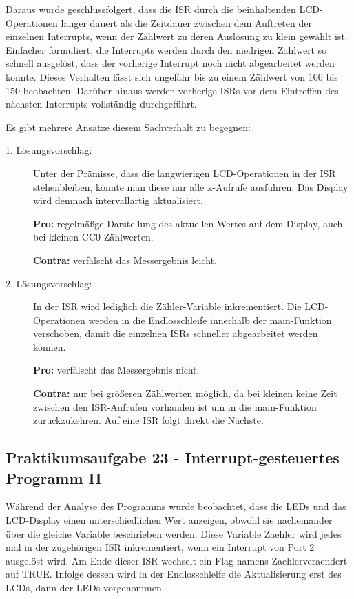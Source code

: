 \documentclass[12pt,a4paper,bibliography=totocnumbered,listof=totocnumbered]{scrartcl}
\begin{document}
Daraus wurde geschlussfolgert, dass die ISR durch die beinhaltenden LCD-Operationen länger dauert als die Zeitdauer zwischen dem Auftreten der einzelnen Interrupts, wenn der Zählwert zu deren Auslösung zu klein gewählt ist. Einfacher formuliert, die Interrupts werden durch den niedrigen Zählwert so schnell ausgelöst, dass der vorherige Interrupt noch nicht abgearbeitet werden konnte. Dieses Verhalten lässt sich ungefähr bis zu einem Zählwert von 100 bis 150 beobachten. Darüber hinaus werden vorherige ISRs vor dem Eintreffen des nächsten Interrupts vollständig durchgeführt.


Es gibt mehrere Ansätze diesem Sachverhalt zu begegnen:
\begin{description}
	\item[1. Lösungsvorschlag:] Unter der Prämisse, dass die langwierigen LCD-Operationen in der ISR stehenbleiben, könnte man diese nur alle x-Aufrufe ausführen. Das Display wird demnach intervallartig aktualisiert.
	
	\textbf{Pro:} regelmäßge Darstellung des aktuellen Wertes auf dem Display, auch bei kleinen CC0-Zählwerten.
	
	\textbf{Contra:} verfälscht das Messergebnis leicht. 
	
	\item[2. Lösungsvorschlag:] In der ISR wird lediglich die Zähler-Variable inkrementiert. Die LCD-Operationen werden in die Endlosschleife innerhalb der main-Funktion verschoben, damit die einzelnen ISRs schneller abgearbeitet werden können.
	
	\textbf{Pro:} verfälscht das Messergebnis nicht.
	
	\textbf{Contra:} nur bei größeren Zählwerten möglich, da bei kleinen keine Zeit zwischen den ISR-Aufrufen vorhanden ist um in die main-Funktion zurückzukehren. Auf eine ISR folgt direkt die Nächste.
\end{description}

\subsection{Praktikumsaufgabe 23 - Interrupt-gesteuertes Programm II}
Während der Analyse des Programms wurde beobachtet, dass die LEDs und das LCD-Display einen unterschiedlichen Wert anzeigen, obwohl sie nacheinander über die gleiche Variable beschrieben werden. Diese Variable \glqq Zaehler\grqq{} wird jedes mal in der zugehörigen ISR inkrementiert, wenn ein Interrupt von Port 2 ausgelöst wird. Am Ende dieser ISR wechselt ein Flag namens \glqq Zaehlerveraendert\grqq{} auf TRUE. Infolge dessen wird in der Endlosschleife die Aktualisierung erst des LCDs, dann der LEDs vorgenommen. 
\end{document}
